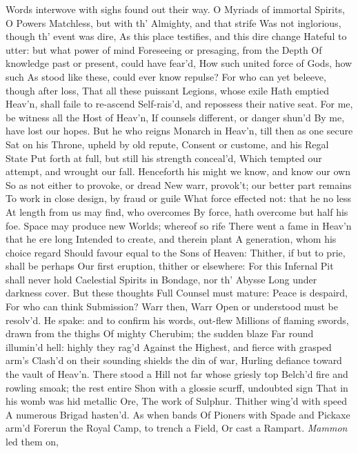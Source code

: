 \documentclass[11pt]{book}
\newcounter {first}
\begin{document}
Words interwove with sighs found out their way. 
\quad O Myriads of immortal Spirits, O Powers 
Matchless, but with th' Almighty, and that strife 
Was not inglorious, though th' event was dire, 
As this place testifies, and this dire change 
Hateful to utter: but what power of mind 
Foreseeing or presaging, from the Depth 
Of knowledge past or present, could have fear'd, 
How such united force of Gods, how such 
As stood like these, could ever know repulse? 
For who can yet beleeve, though after loss, 
That all these puissant Legions, whose exile 
Hath emptied Heav'n, shall faile to re-ascend 
Self-rais'd, and repossess their native seat. 
For me, be witness all the Host of Heav'n, 
If counsels different, or danger shun'd 
By me, have lost our hopes.  But he who reigns 
Monarch in Heav'n, till then as one secure 
Sat on his Throne, upheld by old repute, 
Consent or custome, and his Regal State 
Put forth at full, but still his strength conceal'd, 
Which tempted our attempt, and wrought our fall. 
Henceforth his might we know, and know our own 
So as not either to provoke, or dread 
New warr, provok't; our better part remains 
To work in close design, by fraud or guile 
What force effected not: that he no less 
At length from us may find, who overcomes 
By force, hath overcome but half his foe. 
Space may produce new Worlds; whereof so rife 
There went a fame in Heav'n that he ere long 
Intended to create, and therein plant 
A generation, whom his choice regard 
Should favour equal to the Sons of Heaven: 
Thither, if but to prie, shall be perhaps 
Our first eruption, thither or elsewhere: 
For this Infernal Pit shall never hold 
Caelestial Spirits in Bondage, nor th' Abysse 
Long under darkness cover.  But these thoughts 
Full Counsel must mature: Peace is despaird, 
For who can think Submission?  Warr then, Warr 
Open or understood must be resolv'd. 
\quad He spake: and to confirm his words, out-flew 
Millions of flaming swords, drawn from the thighs 
Of mighty Cherubim; the sudden blaze 
Far round illumin'd hell: highly they rag'd 
Against the Highest, and fierce with grasped arm's 
Clash'd on their sounding shields the din of war, 
Hurling defiance toward the vault of Heav'n. 
\quad There stood a Hill not far whose griesly top 
Belch'd fire and rowling smoak; the rest entire 
Shon with a glossie scurff, undoubted sign 
That in his womb was hid metallic Ore, 
The work of Sulphur.  Thither wing'd with speed 
A numerous Brigad hasten'd.  As when bands 
Of Pioners with Spade and Pickaxe arm'd 
Forerun the Royal Camp, to trench a Field, 
Or cast a Rampart.  \textit{Mammon} led them on, 
\end{document}
